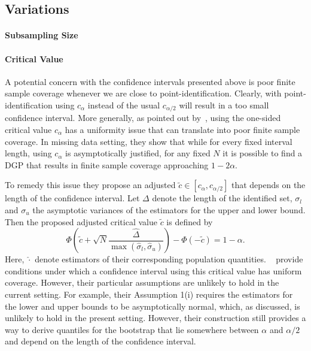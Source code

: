 \documentclass[12pt,a4paper,english]{article} %
\numberwithin{equation}{section}
\theoremstyle{definition}
\theoremstyle{remark}
\theoremstyle{plain}
\begin{document}
\subsection{Variations}

\paragraph{Subsampling Size}

\paragraph{Critical Value}
A potential concern with the confidence intervals presented above is poor finite sample coverage whenever we are close to point-identification.
Clearly, with point-identification using $c_\alpha$ instead of the usual $c_{\alpha/2}$ will result in a too small confidence interval.
More generally, as pointed out by~\cite{imbens2004confidence}, using the one-sided critical value $c_\alpha$ has a uniformity issue that can translate into poor finite sample coverage.
In missing data setting, they show that while for every fixed interval length, using $c_\alpha$ is asymptotically justified, for any fixed $N$ it is possible to find a DGP that results in finite sample coverage approaching $1-2\alpha$.

To remedy this issue they propose an adjusted $\tilde{c}\in[c_{\alpha}, c_{\alpha/2}]$ that depends on the length of the confidence interval.
Let $\Delta$ denote the length of the identified set, $\sigma_l$ and $\sigma_u$ the asymptotic variances of the estimators for the upper and lower bound.
Then the proposed adjusted critical value $\tilde{c}$ is defined by
\begin{equation}\label{eq:imbens_manski_crit}
  \Phi\left(\tilde{c} + \sqrt{N}\frac{\hat{\Delta}}{\max(\hat{\sigma}_l, \hat{\sigma}_u)}\right) - \Phi\left(-\tilde{c}\right) = 1 - \alpha.
\end{equation}
Here, $\hat{\cdot}$ denote estimators of their corresponding population quantities.
~\cite{imbens2004confidence} provide conditions under which a confidence interval using this critical value has uniform coverage.
However, their particular assumptions are unlikely to hold in the current setting.
For example, their Assumption 1(i) requires the estimators for the lower and upper bounds to be asymptotically normal, which, as discussed, is unlikely to hold in the present setting.
However, their construction still provides a way to derive quantiles for the bootstrap that lie somewhere between $\alpha$ and $\alpha/2$ and depend on the length of the confidence interval.
\end{document}
